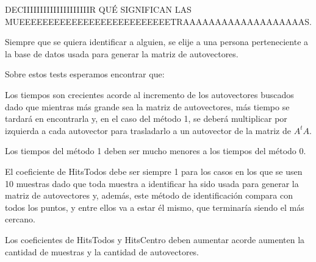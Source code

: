DECIIIIIIIIIIIIIIIIIIIIR QUÉ SIGNIFICAN LAS MUEEEEEEEEEEEEEEEEEEEEEEEEEETRAAAAAAAAAAAAAAAAAAAS.

Siempre que se quiera identificar a alguien, se elije a una persona perteneciente a la base de datos
usada para generar la matriz de autovectores.


Sobre estos tests esperamos encontrar que:
\begin{compactitem}
  \item Los tiempos son crecientes acorde al incremento de los autovectores buscados dado que
  mientras más grande sea la matriz de autovectores, más tiempo se tardará en encontrarla y, en el
  caso del método 1, se deberá multiplicar por izquierda a cada autovector para trasladarlo a un
  autovector de la matriz de $A^t A$.
  \item Los tiempos del método 1 deben ser mucho menores a los tiempos del método 0.
  \item El coeficiente de HitsTodos debe ser siempre 1 para los casos en los que se usen 10 muestras
  dado que toda muestra a identificar ha sido usada para generar la matriz de autovectores y,
  además, este método de identificación compara con todos los puntos, y entre ellos va a estar él
  mismo, que terminaría siendo el más cercano.
  \item Los coeficientes de HitsTodos y HitsCentro deben aumentar acorde aumenten la cantidad de
  muestras y la cantidad de autovectores.
\end{compactitem}

